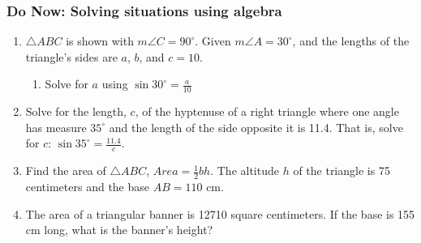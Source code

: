 \documentclass[12pt, twoside]{article}
\begin{document}
\subsubsection*{Do Now: Solving situations using algebra}
 \begin{enumerate}

 \item $\triangle ABC$ is shown with $m\angle C=90^\circ$. Given $m\angle A =30^\circ$, and the lengths of the triangle's sides are $a$, $b$, and $c=10$. \vspace{0.1cm}
   \begin{multicols}{2}

       \begin{enumerate}
       \item Solve for $a$ using $\displaystyle \sin 30^\circ =\frac{a}{10}$ \vspace{0.75cm}
     \end{enumerate}
   \end{multicols} \vspace{1cm}

 \item Solve for the length, $c$, of the hyptenuse of a right triangle where one angle has measure $35^\circ$ and the length of the side opposite it is 11.4. That is, solve for $c$: $\displaystyle \sin 35^\circ =\frac{11.4}{c}$.  \vspace{4cm}

 \item Find the area of $\triangle ABC$,  $Area= \frac{1}{2}bh$. The altitude $h$ of the triangle is 75 centimeters and the base $AB=110$ cm.\\[0.5cm]
  \vspace{0.5cm}

\item The area of a triangular banner is 12710 square centimeters. If the base is 155 cm long, what is the banner's height?

\end{enumerate}
\end{document}
